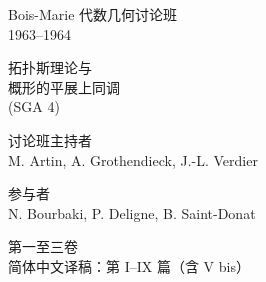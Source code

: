 \thispagestyle{empty}
\vspace*{1.3cm}
\begin{center}
Bois-Marie 代数几何讨论班\\[0.8em]
1963--1964
\vspace{2cm}

{\Large 拓扑斯理论与\\[0.6em]
概形的平展上同调}\\[0.8em]
(SGA 4)
\vspace{1.7cm}

讨论班主持者\\[0.8em]
M. Artin, A. Grothendieck, J.-L. Verdier
\vspace{1.4cm}

参与者\\[0.8em]
N. Bourbaki, P. Deligne, B. Saint-Donat
\vspace{1.7cm}

第一至三卷\\[0.8em]
简体中文译稿：第 I--IX 篇（含 V bis）
\end{center}
\clearpage
